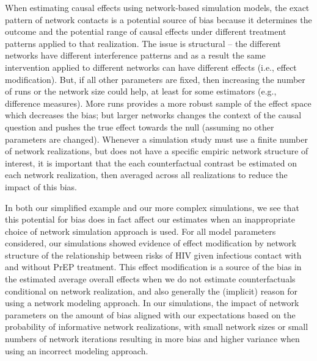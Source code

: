 \documentclass{article}
\theoremstyle{definition}
\begin{document}
 When estimating causal effects using network-based simulation models, the exact pattern of network contacts is a potential source of bias because it determines the outcome and the potential range of causal effects under different treatment patterns applied to  that realization. The issue is structural -- the different networks have different interference patterns and as a result the same intervention applied to different networks can have different effects (i.e., effect modification). But, if all other parameters are fixed, then increasing the number of runs or the network size could help, at least for some estimators (e.g., difference measures). More runs provides a more robust sample of the effect space which decreases the bias; but larger networks changes the context of the causal question and pushes the true effect towards the null (assuming no other parameters are changed). Whenever a simulation study must use a finite number of network realizations, but does not have a specific empiric network structure of interest, it is important that the each counterfactual contrast be estimated on each network realization, then averaged across all realizations to reduce the impact of this bias. 

 In both our simplified example and our more complex simulations, we see that this potential for bias does in fact affect our estimates when an inappropriate choice of network simulation approach is used.  For all model parameters considered, our simulations showed evidence of effect modification by network structure of the relationship between risks of HIV given infectious contact with and without PrEP treatment. This effect modification is a source of the bias in the estimated average overall effects when we do not estimate counterfactuals conditional on network realization, and also generally the (implicit) reason for using a network modeling approach. In our simulations, the impact of network parameters on the amount of bias aligned with our expectations based on the probability of informative network realizations, with small network sizes or small numbers of network iterations resulting in more bias and higher variance when using an incorrect modeling approach.
\end{document}
